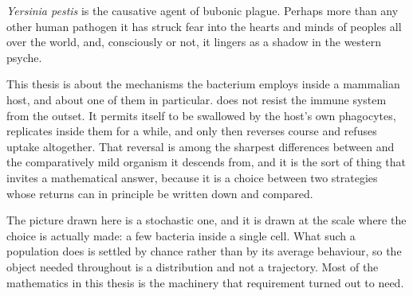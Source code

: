
\textit{Yersinia pestis} is the causative agent of bubonic plague. Perhaps more
than any other human pathogen it has struck fear into the hearts and minds of
peoples all over the world, and, consciously or not, it lingers as a shadow in
the western psyche.

This thesis is about the mechanisms the bacterium employs inside a mammalian
host, and about one of them in particular. \yp{} does not resist the immune
system from the outset. It permits itself to be swallowed by the host's own
phagocytes, replicates inside them for a while, and only then reverses course
and refuses uptake altogether. That reversal is among the sharpest differences
between \yp{} and the comparatively mild organism it descends from, and it is
the sort of thing that invites a mathematical answer, because it is a choice
between two strategies whose returns can in principle be written down and
compared.

The picture drawn here is a stochastic one, and it is drawn at the scale where
the choice is actually made: a few bacteria inside a single cell. What such a
population does is settled by chance rather than by its average behaviour, so
the object needed throughout is a distribution and not a trajectory. Most of
the mathematics in this thesis is the machinery that requirement turned out to
need.
